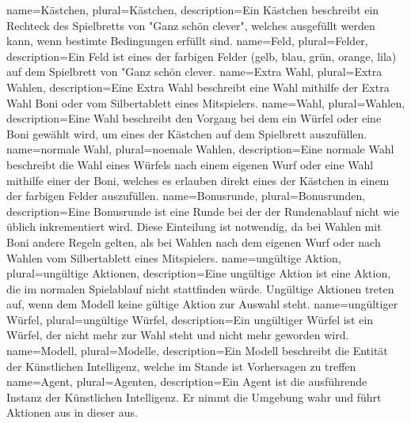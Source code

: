 {
	name=Kästchen,
	plural=Kästchen,
	description={Ein Kästchen beschreibt ein Rechteck des Spielbretts von "Ganz schön clever", welches ausgefüllt werden kann, wenn bestimte Bedingungen erfüllt sind.}
}
{
	name=Feld,
	plural=Felder,
	description={Ein Feld ist eines der farbigen Felder (gelb, blau, grün, orange, lila) auf dem Spielbrett von "Ganz schön clever.}
}
{
	name=Extra Wahl,
	plural=Extra Wahlen,
	description={Eine Extra Wahl beschreibt eine Wahl mithilfe der Extra Wahl Boni oder vom Silbertablett eines Mitspielers.}
}
{
	name=Wahl,
	plural=Wahlen,
	description={Eine Wahl beschreibt den Vorgang bei dem ein Würfel oder eine Boni gewählt wird, um eines der Kästchen auf dem Spielbrett auszufüllen.\newpage}
}
{
	name=normale Wahl,
	plural=noemale Wahlen,
	description={Eine normale Wahl beschreibt die Wahl eines Würfels nach einem eigenen Wurf oder eine Wahl mithilfe einer der Boni, welches es erlauben direkt eines der Kästchen in einem der farbigen Felder auszufüllen.}
}
{
	name=Bonusrunde,
	plural=Bonusrunden,
	description={Eine Bonusrunde ist eine Runde bei der der Rundenablauf nicht wie üblich inkrementiert wird. Diese Einteilung ist notwendig, da bei Wahlen mit Boni andere Regeln gelten, als bei Wahlen nach dem eigenen Wurf oder nach Wahlen vom Silbertablett eines Mitspielers.}
}
{
	name=ungültige Aktion,
	plural=ungültige Aktionen,
	description={Eine ungültige Aktion ist eine Aktion, die im normalen Spielablauf nicht stattfinden würde. Ungültige Aktionen treten auf, wenn dem Modell keine gültige Aktion zur Auswahl steht.}
}
{
	name=ungültiger Würfel,
	plural=ungültige Würfel,
	description={Ein ungültiger Würfel ist ein Würfel, der nicht mehr zur Wahl steht und nicht mehr geworden wird.}
}
{
	name=Modell,
	plural=Modelle,
	description={Ein Modell beschreibt die Entität der Künstlichen Intelligenz, welche im Stande ist Vorhersagen zu treffen}
}
{
	name=Agent,
	plural=Agenten,
	description={Ein Agent ist die ausführende Instanz der Künstlichen Intelligenz. Er nimmt die Umgebung wahr und führt Aktionen aus in dieser aus.}
}